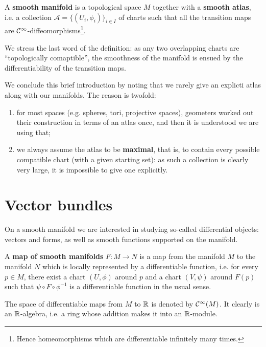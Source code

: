 \documentclass[main.tex]{subfiles}
\begin{document}
\begin{definition}
	A \textbf{smooth manifold} is a topological space $M$ together with a \textbf{smooth atlas}, i.e. a collection $\mathcal A = \{(U_i, \phi_i)\}_{i \in I}$ of charts such that all the transition maps are $\mathcal{C}^\infty$-diffeomorphisms\footnote{Hence homeomorphisms which are differentiable infinitely many times.}.
\end{definition}

\begin{remark}
	We stress the last word of the definition: as any two overlapping charts are ``topologically comaptible'', the smoothness of the manifold is ensued by the differentiability of the transition maps.
\end{remark}

We conclude this brief introduction by noting that we rarely give an explicti atlas along with our manifolds. The reason is twofold:
\begin{enumerate}
	\item for most spaces (e.g. spheres, tori, projective spaces), geometers worked out their construction in terms of an atlas once, and then it is understood we are using that;
	\item we always assume the atlas to be \textbf{maximal}, that is, to contain every possible compatible chart (with a given starting set): as such a collection is clearly very large, it is impossible to give one explicitly.
\end{enumerate}

\section{Vector bundles}
On a smooth manifold we are interested in studying so-called differential objects: vectors and forms, as well as smooth functions supported on the manifold.

\begin{definition}
	A \textbf{map of smooth manifolds} $F:M \to N$ is a map from the manifold $M$ to the manifold $N$ which is locally represented by a differentiable function, i.e. for every $p \in M$, there exist a chart $(U, \phi)$ around $p$ and a chart $(V, \psi)$ around $F(p)$ such that $\psi \circ F \circ \phi^{-1}$ is a differentiable function in the usual sense.
\end{definition}

The space of differentiable maps from $M$ to $\mathbb{R}$ is denoted by $\mathcal{C}^\infty(M)$. It clearly is an $\mathbb{R}$-algebra, i.e. a ring whose addition makes it into an $\mathbb{R}$-module.
\end{document}
